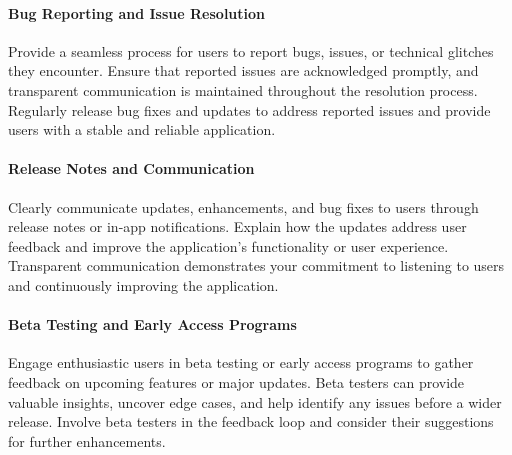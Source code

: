 \paragraph{Bug Reporting and Issue Resolution}
Provide a seamless process for users to report bugs, issues, or technical glitches they encounter. Ensure that 
reported issues are acknowledged promptly, and transparent communication is maintained throughout the resolution 
process. Regularly release bug fixes and updates to address reported issues and provide users with a stable and 
reliable application.

\paragraph{Release Notes and Communication}
Clearly communicate updates, enhancements, and bug fixes to users through release notes or in-app notifications. 
Explain how the updates address user feedback and improve the application's functionality or user experience. 
Transparent communication demonstrates your commitment to listening to users and continuously improving the 
application.

\paragraph{Beta Testing and Early Access Programs}
Engage enthusiastic users in beta testing or early access programs to gather feedback on upcoming features or 
major updates. Beta testers can provide valuable insights, uncover edge cases, and help identify any issues 
before a wider release. Involve beta testers in the feedback loop and consider their suggestions for further 
enhancements.


